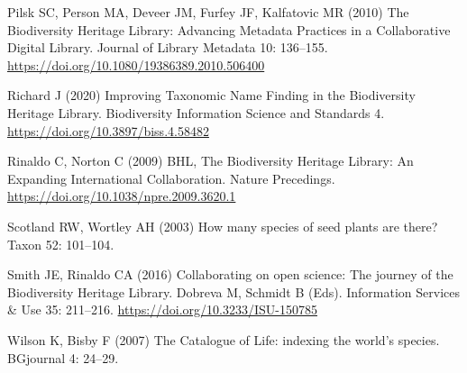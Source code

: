 \documentclass[
]{article}
\newlength{\cslhangindent}
\newlength{\cslentryspacingunit} %
\newenvironment{CSLReferences}[2] %
 {%
  \setlength{\parindent}{0pt}
  \ifodd #1
  \let\oldpar\par
  \def\par{\hangindent=\cslhangindent\oldpar}
  \fi
  \setlength{\parskip}{#2\cslentryspacingunit}
 }%
 {}
\begin{document}
\begin{CSLReferences}{1}{0}
\leavevmode{}%
Pilsk SC, Person MA, Deveer JM, Furfey JF, Kalfatovic MR (2010) {The
Biodiversity Heritage Library: Advancing Metadata Practices in a
Collaborative Digital Library}. Journal of Library Metadata 10:
136--155. \url{https://doi.org/10.1080/19386389.2010.506400}

\leavevmode{}%
Richard J (2020) {Improving Taxonomic Name Finding in the Biodiversity
Heritage Library}. Biodiversity Information Science and Standards 4.
\url{https://doi.org/10.3897/biss.4.58482}

\leavevmode{}%
Rinaldo C, Norton C (2009) {BHL, The Biodiversity Heritage Library: An
Expanding International Collaboration}. Nature Precedings.
\url{https://doi.org/10.1038/npre.2009.3620.1}

\leavevmode{}%
Scotland RW, Wortley AH (2003) {How many species of seed plants are
there?} Taxon 52: 101--104.

\leavevmode{}%
Smith JE, Rinaldo CA (2016) {Collaborating on open science: The journey
of the Biodiversity Heritage Library}. Dobreva M, Schmidt B (Eds).
Information Services \& Use 35: 211--216.
\url{https://doi.org/10.3233/ISU-150785}

\leavevmode{}%
Wilson K, Bisby F (2007) {The Catalogue of Life: indexing the world's
species}. BGjournal 4: 24--29.

\end{CSLReferences}
\end{document}
